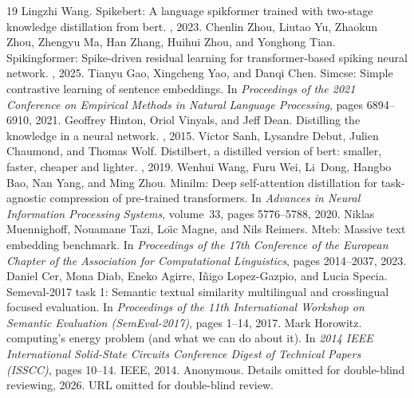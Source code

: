 \documentclass[11pt, conference, compsoc, twoside]{IEEEtran}
\begin{document}
\begin{thebibliography}{19}
  Lingzhi Wang.
\newblock Spikebert: A language spikformer trained with two-stage knowledge
  distillation from bert.
, 2023.
Chenlin Zhou, Liutao Yu, Zhaokun Zhou, Zhengyu Ma, Han Zhang, Huihui Zhou, and
  Yonghong Tian.
\newblock Spikingformer: Spike-driven residual learning for transformer-based
  spiking neural network.
, 2025.
Tianyu Gao, Xingcheng Yao, and Danqi Chen.
\newblock Simcse: Simple contrastive learning of sentence embeddings.
\newblock In {\em Proceedings of the 2021 Conference on Empirical Methods in
  Natural Language Processing}, pages 6894--6910, 2021.
Geoffrey Hinton, Oriol Vinyals, and Jeff Dean.
\newblock Distilling the knowledge in a neural network.
, 2015.
Victor Sanh, Lysandre Debut, Julien Chaumond, and Thomas Wolf.
\newblock Distilbert, a distilled version of bert: smaller, faster, cheaper and
  lighter.
, 2019.
Wenhui Wang, Furu Wei, Li~Dong, Hangbo Bao, Nan Yang, and Ming Zhou.
\newblock Minilm: Deep self-attention distillation for task-agnostic
  compression of pre-trained transformers.
\newblock In {\em Advances in Neural Information Processing Systems},
  volume~33, pages 5776--5788, 2020.
Niklas Muennighoff, Nouamane Tazi, Lo{\"\i}c Magne, and Nils Reimers.
\newblock Mteb: Massive text embedding benchmark.
\newblock In {\em Proceedings of the 17th Conference of the European Chapter of
  the Association for Computational Linguistics}, pages 2014--2037, 2023.
Daniel Cer, Mona Diab, Eneko Agirre, I{\~n}igo Lopez-Gazpio, and Lucia Specia.
\newblock Semeval-2017 task 1: Semantic textual similarity multilingual and
  crosslingual focused evaluation.
\newblock In {\em Proceedings of the 11th International Workshop on Semantic
  Evaluation (SemEval-2017)}, pages 1--14, 2017.
Mark Horowitz.
 computing's energy problem (and what we can do about it).
\newblock In {\em 2014 IEEE International Solid-State Circuits Conference
  Digest of Technical Papers (ISSCC)}, pages 10--14. IEEE, 2014.
Anonymous.
\newblock Details omitted for double-blind reviewing, 2026.
\newblock URL omitted for double-blind review.

\end{thebibliography}
\end{document}
